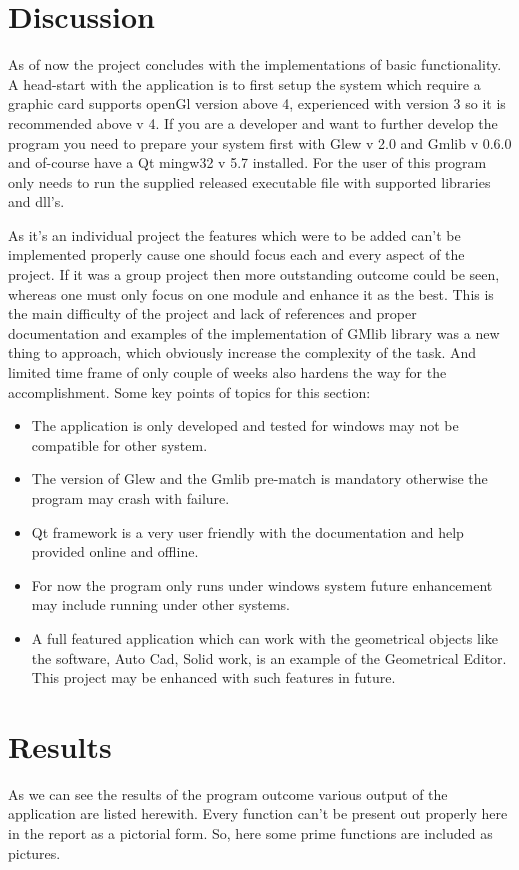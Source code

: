 \documentclass[a4,10pt]{article}
\begin{document}
	  \section{Discussion}
          As of now the project concludes with the implementations of basic functionality. A head-start with the application is to
          first setup the system which require a graphic card supports openGl version above 4, experienced with version 3 so it is recommended above v 4. If you are a developer and want to further develop the program you need to prepare your system first with Glew v 2.0 and Gmlib v 0.6.0 and of-course have a Qt mingw32 v 5.7 installed.
	For the user of this program only needs to run the supplied released executable file with supported libraries and dll's.
	
	
	As it's an individual project the features which were to be added can't be implemented properly cause one should focus each and every aspect of the project. 
	If it was a group project then more outstanding outcome could be seen, whereas one must only focus on one module and enhance it as the best. 
	This is the main difficulty of the project and lack of references and proper documentation and examples of the implementation of GMlib library was a new thing to approach, 
	which obviously increase the complexity of the task. And limited time frame of only couple of weeks also hardens the way for the accomplishment.
	Some key points of topics for this section:
	    \begin{itemize}
	      \item The application is only developed and tested for windows may not be compatible for other system.
	      \item The version of Glew and the Gmlib pre-match is mandatory otherwise the program may crash with failure.
	      \item Qt framework is a very user friendly with the documentation and help provided online and offline.
	      \item For now the program only runs under windows system future enhancement may include running under other systems.
	      \item A full featured application which can work with the geometrical objects like the software, Auto Cad, Solid work, is
	      an example of the Geometrical Editor. This project may be enhanced with such features in future.
	    \end{itemize}

        \section{Results}
	As we can see the results of the program outcome various output of the application are listed herewith. Every function can't be present out properly here in the report as a pictorial form. So, here some prime functions are included as pictures.
	     
\end{document}

